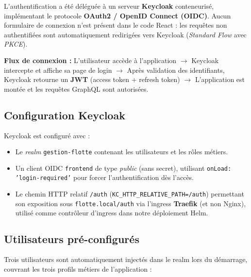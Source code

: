 \documentclass[12pt,a4paper]{article}
\begin{document}
L'authentification a \'{e}t\'{e} d\'{e}l\'{e}gu\'{e}e \`{a} un serveur \textbf{Keycloak} conteneuris\'{e}, impl\'{e}mentant le protocole \textbf{OAuth2 / OpenID Connect (OIDC)}. Aucun formulaire de connexion n'est pr\'{e}sent dans le code React : les requ\^{e}tes non authentifi\'{e}es sont automatiquement redirig\'{e}es vers Keycloak (\textit{Standard Flow} avec \textit{PKCE}).

\begin{infobox}
\textbf{Flux de connexion :} L'utilisateur acc\`{e}de \`{a} l'application $\rightarrow$ Keycloak intercepte et affiche sa page de login $\rightarrow$ Apr\`{e}s validation des identifiants, Keycloak retourne un \textbf{JWT} (access token + refresh token) $\rightarrow$ L'application est mont\'{e}e et les requ\^{e}tes GraphQL sont autoris\'{e}es.
\end{infobox}

\subsection{Configuration Keycloak}

Keycloak est configur\'{e} avec :
\begin{itemize}[leftmargin=*]
  \item Le \textit{realm} \texttt{gestion-flotte} contenant les utilisateurs et les r\^{o}les m\'{e}tiers.
  \item Un client OIDC \texttt{frontend} de type \textit{public} (sans secret), utilisant \texttt{onLoad: 'login-required'} pour forcer l'authentification d\`{e}s l'acc\`{e}s.
  \item Le chemin HTTP relatif \texttt{/auth} (\texttt{KC\_HTTP\_RELATIVE\_PATH=/auth}) permettant son exposition sous \texttt{flotte.local/auth} via l'ingress \textbf{Traefik} (et non Nginx), utilis\'{e} comme contr\^{o}leur d'ingress dans notre d\'{e}ploiement Helm.
\end{itemize}

\subsection{Utilisateurs pr\'{e}-configur\'{e}s}

Trois utilisateurs sont automatiquement inject\'{e}s dans le realm lors du d\'{e}marrage, couvrant les trois profils m\'{e}tiers de l'application :
\end{document}

